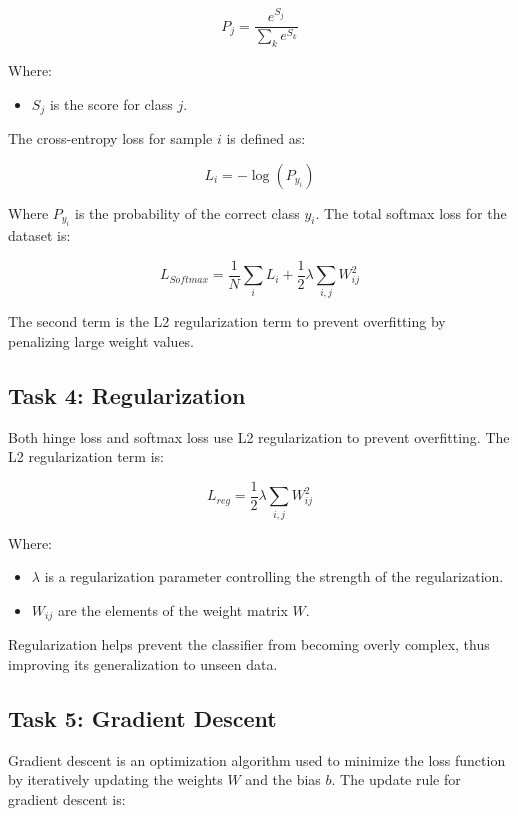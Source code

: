 \documentclass{article}
\begin{document}
\begin{equation}
P_j = \frac{e^{S_j}}{\sum_k e^{S_k}}
\end{equation}

Where:
\begin{itemize}
    \item $S_j$ is the score for class $j$.
\end{itemize}

The cross-entropy loss for sample $i$ is defined as:

\begin{equation}
L_i = -\log(P_{y_i})
\end{equation}

Where $P_{y_i}$ is the probability of the correct class $y_i$. The total softmax loss for the dataset is:

\begin{equation}
L_{Softmax} = \frac{1}{N} \sum_{i} L_i + \frac{1}{2} \lambda \sum_{i,j} W_{ij}^2
\end{equation}

The second term is the L2 regularization term to prevent overfitting by penalizing large weight values.

\subsection{Task 4: Regularization}
Both hinge loss and softmax loss use L2 regularization to prevent overfitting. The L2 regularization term is:

\begin{equation}
L_{reg} = \frac{1}{2} \lambda \sum_{i,j} W_{ij}^2
\end{equation}

Where:
\begin{itemize}
    \item $\lambda$ is a regularization parameter controlling the strength of the regularization.
    \item $W_{ij}$ are the elements of the weight matrix $W$.
\end{itemize}

Regularization helps prevent the classifier from becoming overly complex, thus improving its generalization to unseen data.

\subsection{Task 5: Gradient Descent}
Gradient descent is an optimization algorithm used to minimize the loss function by iteratively updating the weights $W$ and the bias $b$. The update rule for gradient descent is:
\end{document}
